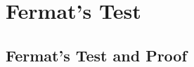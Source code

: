 \documentclass{beamer}
\begin{document}

    
    


\section{Fermat's Test}

\subsection{Fermat's Test and Proof}
\end{document}

